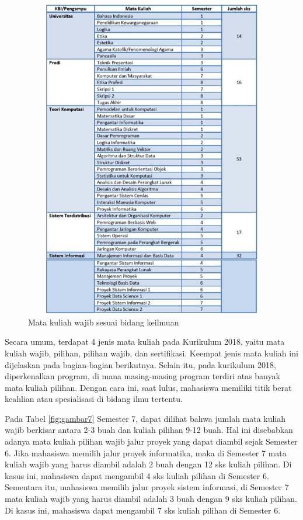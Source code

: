 \begin{figure}[H]
    \centering
    \includegraphics[width=12cm, height=14cm]{Gambar/Mata Kuliah Wajib.jpg}
    \caption{Mata kuliah wajib sesuai bidang keilmuan}
    \label{fig:gambar5}
\end{figure}

Secara umum, terdapat 4 jenis mata kuliah pada Kurikulum 2018, yaitu mata kuliah wajib, pilihan, pilihan wajib, dan sertifikasi. Keempat jenis mata kuliah ini dijelaskan pada bagian-bagian berikutnya. Selain itu, pada kurikulum 2018, diperkenalkan program, di mana masing-masing program terdiri atas banyak mata kuliah pilihan. Dengan cara ini, saat lulus, mahasiswa memiliki titik berat keahlian atau spesialisasi di
bidang ilmu tertentu.

Pada Tabel \ref{fig:gambar7} Semester 7, dapat dilihat bahwa jumlah mata kuliah wajib berkisar antara 2-3 buah dan kuliah pilihan 9-12 buah. Hal ini disebabkan adanya mata kuliah pilihan wajib jalur proyek yang dapat diambil sejak Semester 6. Jika mahasiswa memilih jalur proyek informatika, maka di Semester 7 mata kuliah wajib yang harus diambil adalah 2 buah dengan 12 sks kuliah pilihan. Di kasus ini, mahasiswa dapat mengambil 4 sks kuliah pilihan di Semester 6. Sementara itu, mahasiswa memilih jalur proyek sistem informasi, di Semester 7 mata kuliah wajib yang harus diambil adalah 3 buah dengan 9 sks kuliah pilihan.
Di kasus ini, mahasiswa dapat mengambil 7 sks kuliah pilihan di Semester 6.

